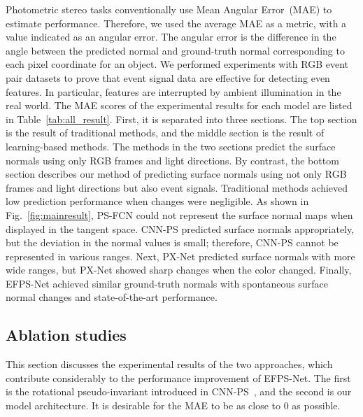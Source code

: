 Photometric stereo tasks conventionally use Mean Angular Error~(MAE) to estimate performance. Therefore, we used the average MAE as a metric, with a value indicated as an angular error. The angular error is the difference in the angle between the predicted normal and ground-truth normal corresponding to each pixel coordinate for an object. We performed experiments with RGB event pair datasets to prove that event signal data are effective for detecting even features. In particular, features are interrupted by ambient illumination in the real world. The MAE scores of the experimental results for each model are listed in Table~\ref{tab:all_result}. First, it is separated into three sections. The top section is the result of traditional methods, and the middle section is the result of learning-based methods. The methods in the two sections predict the surface normals using only RGB frames and light directions. By contrast, the bottom section describes our method of predicting surface normals using not only RGB frames and light directions but also event signals. Traditional methods achieved low prediction performance when changes were negligible. As shown in Fig.~\ref{fig:mainresult}, PS-FCN could not represent the surface normal maps when displayed in the tangent space. CNN-PS predicted surface normals appropriately, but the deviation in the normal values is small; therefore, CNN-PS cannot be represented in various ranges. Next, PX-Net predicted surface normals with more wide ranges, but PX-Net showed sharp changes when the color changed. Finally, EFPS-Net achieved similar ground-truth normals with spontaneous surface normal changes and state-of-the-art performance.

\subsection{Ablation studies}
This section discusses the experimental results of the two approaches, which contribute considerably to the performance improvement of EFPS-Net. The first is the rotational pseudo-invariant introduced in CNN-PS~\citep{ikehata2018cnn}, and the second is our model architecture. It is desirable for the MAE to be as close to 0 as possible.

